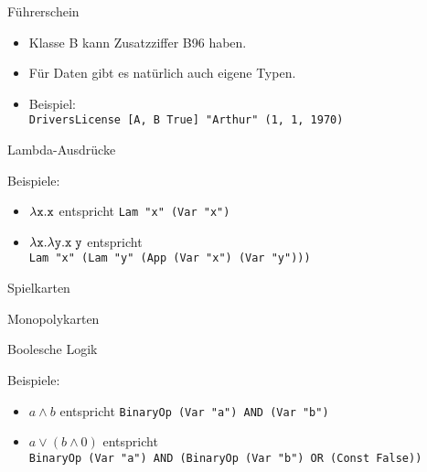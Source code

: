 \documentclass{beamer}
\begin{document}
\begin{frame}{Führerschein}

  \vfill

  \begin{itemize}
    \item Klasse B kann Zusatzziffer B96 haben.
    \item Für Daten gibt es natürlich auch eigene Typen.
    \item Beispiel:\\
          \texttt{DriversLicense [A, B True] "{}Arthur"{} (1, 1, 1970)}
  \end{itemize}
\end{frame}

\begin{frame}{Lambda-Ausdrücke}

  \vfill

  Beispiele:
  \begin{itemize}
    \item $\lambda \texttt{x} . \texttt{x}$ entspricht \texttt{Lam "{}x"{} (Var "{}x"{})}
    \item $\lambda \texttt{x} . \lambda \texttt{y} . \texttt{x} \; \texttt{y}$ entspricht\\
          \texttt{Lam "{}x"{} (Lam "{}y"{} (App (Var "{}x"{}) (Var "{}y"{})))}
  \end{itemize}
\end{frame}

\begin{frame}{Spielkarten}
\end{frame}

\begin{frame}{Monopolykarten}
\end{frame}

\begin{frame}{Boolesche Logik}

  \vfill

  Beispiele:
  \begin{itemize}
    \item $a \wedge b$ entspricht \texttt{BinaryOp (Var "{}a"{}) AND (Var "{}b"{})}
    \item $a \vee (b \wedge 0)$ entspricht\\
          \texttt{BinaryOp (Var "{}a"{}) AND (BinaryOp (Var "{}b"{}) OR (Const False))}
  \end{itemize}
\end{frame}
\end{document}
